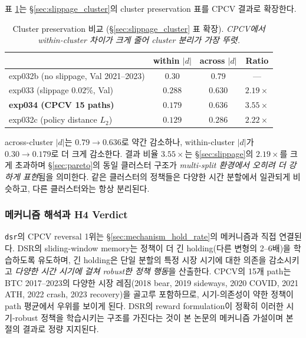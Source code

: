 \documentclass[11pt, a4paper]{article}
\begin{document}
표 \ref{tab:cluster_preservation_cpcv}는 \S\ref{sec:slippage_cluster}의 cluster
preservation 표를 CPCV 결과로 확장한다.

\begin{table}[!htbp]
\centering
\caption{Cluster preservation 비교 (\S\ref{sec:slippage_cluster} 표 확장).
\textit{CPCV에서 within-cluster 차이가 크게 줄어 cluster 분리가 가장 뚜렷.}}
\begin{tabular}{lccc}
\toprule
 & within $|d|$ & across $|d|$ & Ratio \\
\midrule
exp032b (no slippage, Val 2021--2023) & $0.30$ & $0.79$ & --- \\
exp033 (slippage $0.02\%$, Val) & $0.288$ & $0.630$ & $2.19\times$ \\
\textbf{exp034 (CPCV 15 paths)} & $\mathbf{0.179}$ & $\mathbf{0.636}$ & $\mathbf{3.55\times}$ \\
\midrule
exp032c (policy distance $L_2$) & $0.129$ & $0.286$ & $2.22\times$ \\
\bottomrule
\end{tabular}
\label{tab:cluster_preservation_cpcv}
\end{table}

across-cluster $|d|$는 $0.79 \to 0.636$로 약간 감소하나, within-cluster $|d|$가
$0.30 \to 0.179$로 더 크게 감소한다. 결과 비율 $3.55\times$는 \S\ref{sec:slippage}의
$2.19\times$를 크게 초과하며 \S\ref{sec:pareto}의 동일 클러스터 구조가
\emph{multi-split 환경에서 오히려 더 강하게 표현}됨을 의미한다. 같은 클러스터의
정책들은 다양한 시간 분할에서 일관되게 비슷하고, 다른 클러스터와는 항상 분리된다.

\subsubsection{메커니즘 해석과 H4 Verdict}
\label{sec:cpcv_mechanism}

\texttt{dsr}의 CPCV reversal 1위는 \S\ref{sec:mechanism_hold_rate}의 메커니즘과
직접 연결된다. DSR의 sliding-window memory는 정책이 더 긴 holding(다른 변형의
2--6배)을 학습하도록 유도하며, 긴 holding은 단일 분할의 특정 시장 시기에 대한
의존을 감소시키고 \emph{다양한 시간 시기에 걸쳐 robust한 정책 행동}을
산출한다. CPCV의 15개 path는 BTC 2017--2023의 다양한 시장 레짐(2018 bear,
2019 sideways, 2020 COVID, 2021 ATH, 2022 crash, 2023 recovery)을 골고루
포함하므로, 시기-의존성이 약한 정책이 path 평균에서 우위를 보이게 된다.
DSR의 reward formulation이 정확히 이러한 시기-robust 정책을 학습시키는 구조를
가진다는 것이 본 논문의 메커니즘 가설이며 본 절의 결과로 정량 지지된다.
\end{document}
